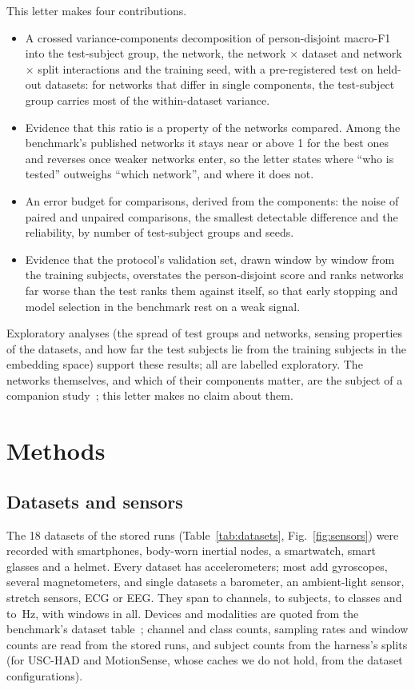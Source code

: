 \documentclass{IEEE_lsens}
\begin{document}
This letter makes four contributions.
\begin{itemize}
\item A crossed variance-components decomposition of person-disjoint macro-F1 into the test-subject group, the
network, the network $\times$ dataset and network $\times$ split interactions and the training seed, with a
pre-registered test on held-out datasets: for networks that differ in single components, the test-subject group
carries most of the within-dataset variance.
\item Evidence that this ratio is a property of the networks compared. Among the benchmark's published networks it
stays near or above 1 for the best ones and reverses once weaker networks enter, so the letter states where ``who is
tested'' outweighs ``which network'', and where it does not.
\item An error budget for comparisons, derived from the components: the noise of paired and unpaired comparisons, the
smallest detectable difference and the reliability, by number of test-subject groups and seeds.
\item Evidence that the protocol's validation set, drawn window by window from the training subjects, overstates the
person-disjoint score and ranks networks far worse than the test ranks them against itself, so that early stopping
and model selection in the benchmark rest on a weak signal.
\end{itemize}
Exploratory analyses (the spread of test groups and networks, sensing properties of the datasets, and how far the test
subjects lie from the training subjects in the embedding space) support these results; all are labelled exploratory.
The networks themselves, and which of their components matter, are the subject of a companion study~\cite{le2026rila};
this letter makes no claim about them.

\section{Methods}
\subsection{Datasets and sensors}
The 18 datasets of the stored runs (Table~\ref{tab:datasets}, Fig.~\ref{fig:sensors}) were recorded with smartphones,
body-worn inertial nodes, a smartwatch, smart glasses and a helmet. Every dataset has accelerometers; most add
gyroscopes, several magnetometers, and single datasets a barometer, an ambient-light sensor, stretch sensors, ECG or
EEG. They span  to  channels,  to
 subjects,  to  classes and
 to \,Hz, with  windows in all. Devices and
modalities are quoted from the benchmark's dataset table~\cite{burzer2026arena}; channel and class counts, sampling
rates and window counts are read from the stored runs, and subject counts from the harness's splits (for USC-HAD and
MotionSense, whose caches we do not hold, from the dataset configurations).
\end{document}
